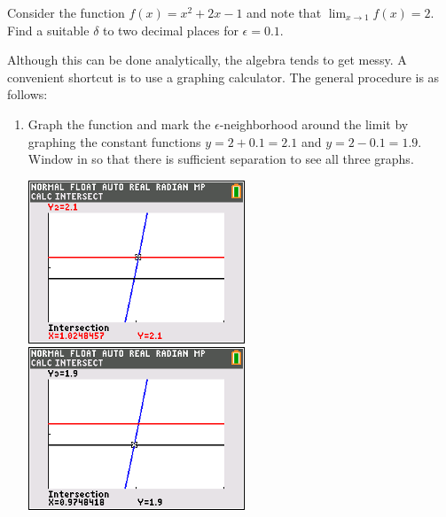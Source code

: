 \documentclass[letterpaper,12pt,fleqn]{article}
\newcommand{\e}{\epsilon}
\renewcommand{\d}{\delta}
\begin{document}
\begin{example}
  Consider the function \(f(x)=x^2+2x-1\) and note that \(\displaystyle\lim_{x\to1}f(x)=2\).  Find a suitable
  \(\d\) to two decimal places for \(\e=0.1\).

  \bigskip

  Although this can be done analytically, the algebra tends to get messy.  A convenient shortcut is to use a
  graphing calculator.  The general procedure is as follows:

  \bigskip

  \begin{enumerate}
  \item Graph the function and mark the \(\e\)-neighborhood around the limit by graphing the constant functions
    \(y=2+0.1=2.1\) and \(y=2-0.1=1.9\).  Window in so that there is sufficient separation to see all three
    graphs.

    \bigskip

    \includegraphics[scale=0.75]{poly01a}\qquad
    \includegraphics[scale=0.75]{poly01b}

    \bigskip


\end{enumerate}
\end{example}
\end{document}
